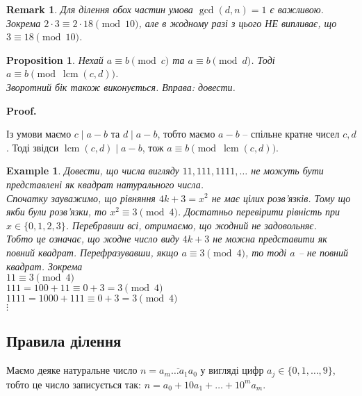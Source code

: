 \documentclass[a4paper, 14pt]{extarticle}
\makeatletter
\theoremstyle{theoremdd}
\theoremstyle{theoremdd}
\theoremstyle{theoremdd}
\theoremstyle{theoremdd}
\newtheorem{example}[theorem]{Example}
\theoremstyle{theoremdd}
\newtheorem{proposition}[theorem]{Proposition}
\theoremstyle{theoremdd}
\newtheorem{remark}[theorem]{Remark}
\theoremstyle{theoremdd}
\theoremstyle{theoremdd}
\def\qed{$\blacksquare$}
\renewenvironment{proof}[1][Proof.\\]{\par
\pushQED{\hfill \qed}%
\normalfont \topsep6\p@\@plus6\p@\relax
\trivlist
\item\relax
{\bfseries
#1\@addpunct{.}}\hspace\labelsep\ignorespaces
}{%
\popQED\endtrivlist\@endpefalse
}
\DeclareMathOperator{\lcm}{lcm}
\makeatother
\begin{document}
\begin{remark}
Для ділення обох частин умова $\gcd(d,n) = 1$ є важливою. Зокрема $2 \cdot 3 \equiv 2 \cdot 18 \pmod {10}$, але в жодному разі з цього НЕ випливає, що $3 \equiv 18 \pmod {10}$.
\end{remark}

\begin{proposition}
Нехай $a \equiv b \pmod c$ та $a \equiv b \pmod d$. Тоді \\
$a \equiv b \pmod {\lcm(c,d)}$.\\
\textit{Зворотний бік також виконується. Вправа: довести.}
\end{proposition}

\begin{proof}
Із умови маємо $c \mid a-b$ та $d \mid a-b$, тобто маємо $a-b$ -- спільне кратне чисел $c,d$. Тоді звідси $\lcm(c,d) \mid a-b$, тож $a \equiv b \pmod {\lcm(c,d)}$.
\end{proof}

\begin{example}
Довести, що числа вигляду $11, 111, 1111, \dots$ не можуть бути представлені як квадрат натурального числа.\\
Спочатку зауважимо, що рівняння $4k+3 = x^2$ не має цілих розв'язків. Тому що якби були розв'язки, то $x^2 \equiv 3 \pmod 4$. Достатньо перевірити рівність при $x \in \{0,1,2,3\}$. Перебравши всі, отримаємо, що жодний не задовольняє.\\
Тобто це означає, що жодне число виду $4k+3$ не можна представити як повний квадрат. Перефразувавши, якщо $a \equiv 3 \pmod 4$, то тоді $a$ -- не повний квадрат. Зокрема\\
$11 \equiv 3 \pmod 4$\\
$111 = 100 + 11 \equiv 0 + 3 = 3 \pmod 4$\\
$1111 = 1000 + 111 \equiv 0 + 3 = 3 \pmod 4$\\
$\vdots$
\end{example}

\subsection{Правила ділення}
Маємо деяке натуральне число $n = \overline{a_m\dots a_1a_0}$ у вигляді цифр $a_j \in \{0,1,\dots,9\}$, тобто це число записується так: $n = a_0 + 10 a_1 + \dots + 10^m a_m$.
\end{document}
